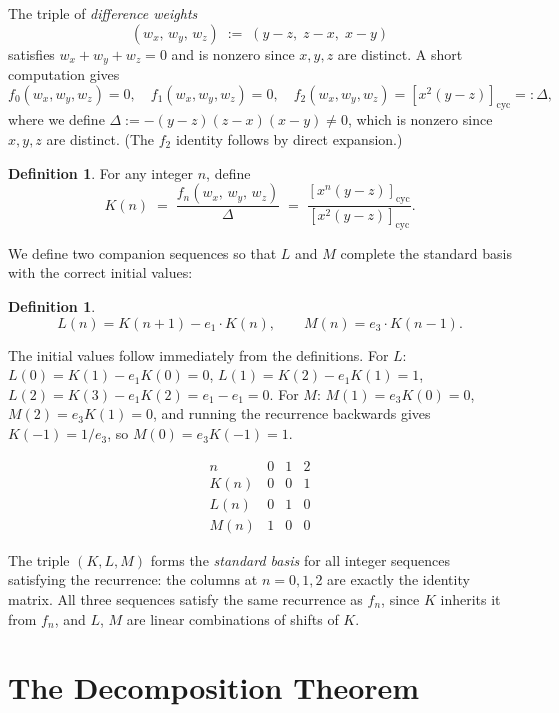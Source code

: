 \documentclass[12pt]{article}
\theoremstyle{definition}
\newtheorem{definition}[theorem]{Definition}
\newcommand{\cyc}[1]{\left[#1\right]_{\!\mathrm{cyc}}}
\begin{document}
	The triple of \emph{difference weights}
	\[
	(w_x,\, w_y,\, w_z) \;:=\; (y-z,\; z-x,\; x-y)
	\]
	satisfies $w_x + w_y + w_z = 0$ and is nonzero since $x,y,z$ are
	distinct.  A short computation gives
	\[
	f_0(w_x,w_y,w_z) = 0, \quad f_1(w_x,w_y,w_z) = 0, \quad
	f_2(w_x,w_y,w_z) = \cyc{x^2(y-z)} =: \Delta,
	\]
	where we define $\Delta := -(y-z)(z-x)(x-y) \neq 0$, which is nonzero since $x,y,z$ are distinct.  (The $f_2$ identity follows by direct expansion.)
	
	\begin{definition}
		\label{def:K}
		For any integer $n$, define
		\[
		K(n) \;=\; \frac{f_n(w_x,\,w_y,\,w_z)}{\Delta}
		\;=\; \frac{\cyc{x^n(y-z)}}{\cyc{x^2(y-z)}}.
		\]
	\end{definition}
	
	We define two companion sequences so that $L$ and $M$ complete the standard basis with the correct initial values:
	
	\begin{definition}
		\label{def:LM}
		\[
		L(n) = K(n+1) - e_1 \cdot K(n), \qquad M(n) = e_3 \cdot K(n-1).
		\]
	\end{definition}
	
	The initial values follow immediately from the definitions.  For $L$: $L(0)=K(1)-e_1K(0)=0$, $L(1)=K(2)-e_1K(1)=1$, $L(2)=K(3)-e_1K(2)=e_1-e_1=0$.  For $M$: $M(1)=e_3K(0)=0$, $M(2)=e_3K(1)=0$, and running the recurrence backwards gives $K(-1)=1/e_3$, so $M(0)=e_3K(-1)=1$.
	
	\[
	\renewcommand{\arraystretch}{1.3}
	\begin{array}{c|ccc}
		n & 0 & 1 & 2 \\\hline
		K(n) & 0 & 0 & 1 \\
		L(n) & 0 & 1 & 0 \\
		M(n) & 1 & 0 & 0
	\end{array}
	\]
	
	The triple $(K, L, M)$ forms the \emph{standard basis} for all integer
	sequences satisfying the recurrence: the columns at $n=0,1,2$ are
	exactly the identity matrix.  All three sequences satisfy the same
	recurrence as $f_n$, since $K$ inherits it from $f_n$, and $L$, $M$
	are linear combinations of shifts of $K$.
	
	\section{The Decomposition Theorem}
	\label{sec:decomposition}
	
\end{document}
